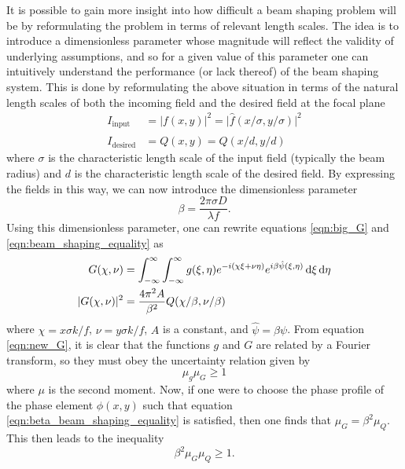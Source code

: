 It is possible to gain more insight into how difficult a beam shaping problem will be by reformulating the problem in terms of relevant length scales.  The idea is to introduce a dimensionless parameter whose magnitude will reflect the validity of underlying assumptions, and so for a given value of this parameter one can intuitively understand the performance (or lack thereof) of the beam shaping system.  This is done by reformulating the above situation in terms of the natural length scales of both the incoming field and the desired field at the focal plane
\begin{align}
	I_{\mathrm{input}} &= \rvert f(x,y)\rvert^2=\rvert\hat{f}(x/\sigma,y/\sigma)\rvert^2\\
	I_{\mathrm{desired}} &= Q(x,y)=\hat{Q}(x/d,y/d)
\end{align}
where $\sigma$ is the characteristic length scale of the input field (typically the beam radius) and $d$ is the characteristic length scale of the desired field.  By expressing the fields in this way, we can now introduce the dimensionless parameter
\begin{equation}
\label{eqn:beta_parameter}
	\beta=\frac{2\pi\sigma D}{\lambda f}.
\end{equation}
Using this dimensionless parameter, one can rewrite equations \ref{eqn:big_G} and \ref{eqn:beam_shaping_equality} as
\begin{align}
\label{eqn:new_G}
	G(\chi,\nu) &= \int_{-\infty}^{\infty}\int_{-\infty}^{\infty} g(\xi,\eta)e^{-i(\chi\xi+\nu\eta)}e^{i\beta\hat{\psi}(\xi,\eta)} \mathop{}\!\mathrm{d}\xi\mathop{}\!\mathrm{d}\eta\\
\label{eqn:beta_beam_shaping_equality}
	\rvert G(\chi, \nu)\rvert^2 &= \frac{4\pi^2 A}{\beta^2}Q(\chi/\beta,\nu/\beta)
\end{align}
where $\chi=x\sigma k /f$, $\nu=y\sigma k /f$, $A$ is a constant, and $\hat{\psi} = \beta\psi$. From equation \ref{eqn:new_G}, it is clear that the functions $g$ and $G$ are related by a Fourier transform, so they must obey the uncertainty relation given by
\begin{equation}
	\mu_g \mu_G\geq 1
\end{equation}
where $\mu$ is the second moment.  Now, if one were to choose the phase profile of the phase element $\phi(x,y)$ such that equation \ref{eqn:beta_beam_shaping_equality} is satisfied, then one finds that $\mu_G=\beta^2\mu_Q$.  This then leads to the inequality
\begin{equation}
\label{eqn:beta_inequalty}
	\beta^2 \mu_G\mu_Q\geq 1.
\end{equation}
